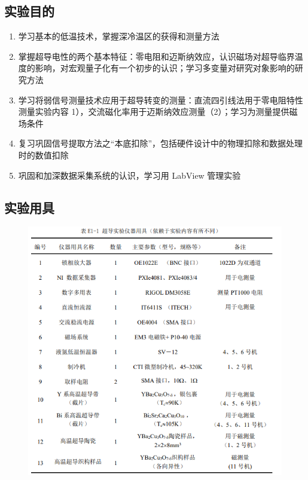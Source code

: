 \documentclass{ctexart}
\theoremstyle{ansstyle}
\begin{document}
\subsection{实验目的}

\begin{enumerate}
    \item 学习基本的低温技术，掌握深冷温区的获得和测量方法
    \item 掌握超导电性的两个基本特征：零电阻和迈斯纳效应，认识磁场对超导临界温度的影响，对宏观量子化有一个初步的认识；学习多变量对研究对象影响的研究方法
    \item 学习将弱信号测量技术应用于超导转变的测量：直流四引线法用于零电阻特性测量实验内容 1），交流磁化率用于迈斯纳效应测量（2）；学习为测量提供磁场条件
    \item 复习巩固信号提取方法之“本底扣除”，包括硬件设计中的物理扣除和数据处理时的数值扣除
    \item 巩固和加深数据采集系统的认识，学习用 LabView 管理实验
\end{enumerate}

\subsection{实验用具}
\begin{figure}[H]
    \centering
    \includegraphics[width=1.0\linewidth]{./png/z1.png}
\end{figure}
\end{document}
